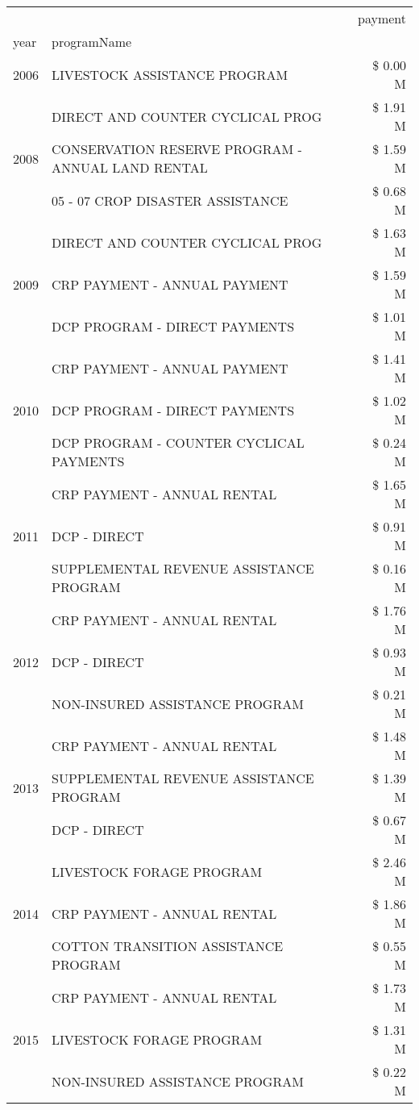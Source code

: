 \begin{tabular}{llr}
\toprule
 &  & payment \\
year & programName &  \\
\midrule
2006 & LIVESTOCK ASSISTANCE PROGRAM & \$ 0.00 M \\
\cline{1-3}
\multirow[t]{3}{*}{2008} & DIRECT AND COUNTER CYCLICAL PROG & \$ 1.91 M \\
 & CONSERVATION RESERVE PROGRAM - ANNUAL LAND RENTAL & \$ 1.59 M \\
 & 05 - 07 CROP DISASTER ASSISTANCE & \$ 0.68 M \\
\cline{1-3}
\multirow[t]{3}{*}{2009} & DIRECT AND COUNTER CYCLICAL PROG & \$ 1.63 M \\
 & CRP PAYMENT - ANNUAL PAYMENT & \$ 1.59 M \\
 & DCP PROGRAM - DIRECT PAYMENTS & \$ 1.01 M \\
\cline{1-3}
\multirow[t]{3}{*}{2010} & CRP PAYMENT - ANNUAL PAYMENT & \$ 1.41 M \\
 & DCP PROGRAM - DIRECT PAYMENTS & \$ 1.02 M \\
 & DCP PROGRAM - COUNTER CYCLICAL PAYMENTS & \$ 0.24 M \\
\cline{1-3}
\multirow[t]{3}{*}{2011} & CRP PAYMENT - ANNUAL RENTAL & \$ 1.65 M \\
 & DCP - DIRECT & \$ 0.91 M \\
 & SUPPLEMENTAL REVENUE ASSISTANCE PROGRAM & \$ 0.16 M \\
\cline{1-3}
\multirow[t]{3}{*}{2012} & CRP PAYMENT - ANNUAL RENTAL & \$ 1.76 M \\
 & DCP - DIRECT & \$ 0.93 M \\
 & NON-INSURED ASSISTANCE PROGRAM & \$ 0.21 M \\
\cline{1-3}
\multirow[t]{3}{*}{2013} & CRP PAYMENT - ANNUAL RENTAL & \$ 1.48 M \\
 & SUPPLEMENTAL REVENUE ASSISTANCE PROGRAM & \$ 1.39 M \\
 & DCP - DIRECT & \$ 0.67 M \\
\cline{1-3}
\multirow[t]{3}{*}{2014} & LIVESTOCK FORAGE PROGRAM & \$ 2.46 M \\
 & CRP PAYMENT - ANNUAL RENTAL & \$ 1.86 M \\
 & COTTON TRANSITION ASSISTANCE PROGRAM & \$ 0.55 M \\
\cline{1-3}
\multirow[t]{3}{*}{2015} & CRP PAYMENT - ANNUAL RENTAL & \$ 1.73 M \\
 & LIVESTOCK FORAGE PROGRAM & \$ 1.31 M \\
 & NON-INSURED ASSISTANCE PROGRAM & \$ 0.22 M \\

\end{tabular}
